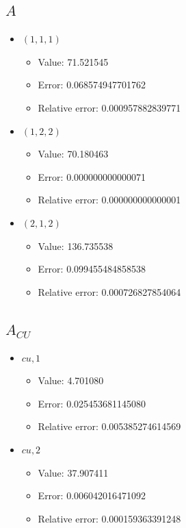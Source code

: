 \documentclass{article}%
\begin{document}
\subsection{$A$}%
\begin{itemize}%
	\item $(1, 1, 1)$%
	\begin{itemize}%
		\item Value: 71.521545%
		\item Error: 0.068574947701762%
		\item Relative error: 0.000957882839771%
	\end{itemize}%
	\item $(1, 2, 2)$%
	\begin{itemize}%
		\item Value: 70.180463%
		\item Error: 0.000000000000071%
		\item Relative error: 0.000000000000001%
	\end{itemize}%
	\item $(2, 1, 2)$%
	\begin{itemize}%
		\item Value: 136.735538%
		\item Error: 0.099455484858538%
		\item Relative error: 0.000726827854064%
	\end{itemize}%
\end{itemize}%
\subsection{$A_{CU}$}%
\begin{itemize}%
	\item $\textit{cu},1$%
	\begin{itemize}%
		\item Value: 4.701080%
		\item Error: 0.025453681145080%
		\item Relative error: 0.005385274614569%
	\end{itemize}%
	\item $\textit{cu},2$%
	\begin{itemize}%
		\item Value: 37.907411%
		\item Error: 0.006042016471092%
		\item Relative error: 0.000159363391248%
	\end{itemize}%
\end{itemize}%
\end{document}
